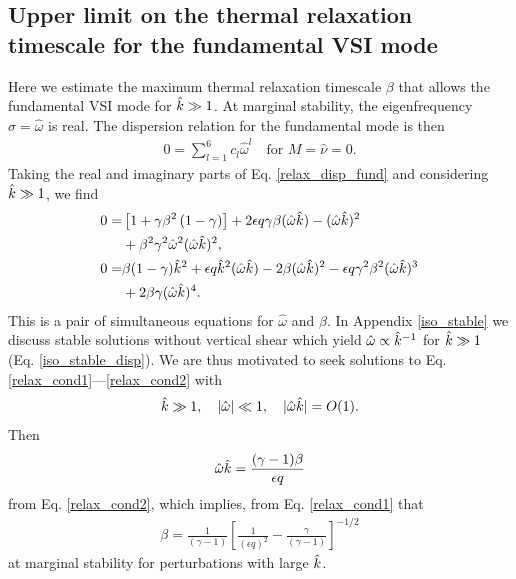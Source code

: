 
\subsection{Upper limit on the thermal relaxation timescale for the
  fundamental VSI mode}\label{iso_vsi_beta_crit}

Here we estimate the maximum thermal relaxation timescale
$\beta$ that allows the fundamental VSI mode for $\hat{k}\gg1$.   
At marginal stability, the eigenfrequency $\hat{\sigma}=\hat{\omega}$
is real. The dispersion relation for the fundamental mode is then
\begin{align}\label{relax_disp_fund}
  0 = \sum_{l=1}^{6}c_l\hat{\omega}^l \quad \text{for $M=\hat{\nu}=0$}.  
\end{align} 
Taking the real and imaginary parts of Eq. \ref{relax_disp_fund} and considering 
$\hat{k}\gg1$, we find
\begin{align}
  0 =& \left[1 + \gamma\beta^2\left(1-\gamma\right)\right] + 2\epsilon q
  \gamma\beta (\hat{\omega}\hat{k}) -  (\hat{\omega}\hat{k})^2 \notag\\
  &+ \beta^2\gamma^2\hat{\omega}^2 (\hat{\omega}\hat{k})^2,\label{relax_cond1}\\
  0=& \beta(1-\gamma)\hat{k}^2 + \epsilon q \hat{k}^2 (\hat{\omega}\hat{k})
  - 2\beta (\hat{\omega}\hat{k})^2 - \epsilon q \gamma^2\beta^2 (\hat{\omega}\hat{k})^3 \notag\\
    &+ 2\beta\gamma(\hat{\omega}\hat{k})^4.  
\label{relax_cond2}
\end{align}
This is a pair of simultaneous equations for
$\hat{\omega}$ and $\beta$. In Appendix \ref {iso_stable} we discuss
stable solutions without vertical shear which yield
$\hat{\omega}\propto \hat{k}^{-1}$ for $\hat{k}\gg 1$
(Eq. \ref{iso_stable_disp}).  We are thus motivated to seek solutions
to Eq. \ref{relax_cond1}---\ref{relax_cond2} with  
\begin{align}
  \hat{k} \gg1, \quad |\hat{\omega}|\ll 1 ,\quad
  |\hat{\omega}\hat{k}|=O(1). 
\end{align}
Then
\begin{align}
  \hat{\omega}\hat{k} = \frac{(\gamma-1)\beta}{\epsilon q}
\end{align}
from Eq. \ref{relax_cond2}, which implies, from Eq. \ref{relax_cond1}
that
\begin{align}\label{beta_crit0}
  \beta = \frac{1}{(\gamma-1)}\left[\frac{1}{\left(\epsilon
        q\right)^2} - \frac{\gamma}{(\gamma-1)}\right]^{-1/2} 
\end{align}
at marginal stability for perturbations with large $\hat{k}$. 

